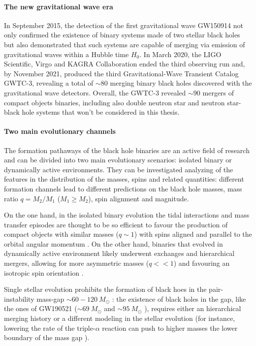 \documentclass[a4paper,titlepage]{book}     	%
\newcommand{\sun}{\ensuremath{_\odot}}
\newcommand{\msun}{\ensuremath{M\sun}}
\begin{document}
\paragraph{The new gravitational wave era} In September 2015, the detection of the first gravitational wave GW150914 not only confirmed the existence of binary systems made of two stellar black holes but also demonstrated that such systems are capable of merging via emission of gravitational waves within a Hubble time $H_0$. \cite{Abbott2016firstGW} In March 2020, the LIGO Scientific, Virgo and KAGRA Collaboration ended the third observing run and, by November 2021, produced the third Gravitational-Wave Transient Catalog GWTC-3, revealing a total of $\sim 80$ merging binary black holes discovered with the gravitational wave detectors. Overall, the GWTC-3 revealed $\sim 90$ mergers of compact objects binaries, including also double neutron star and neutron star-black hole systems that won't be considered in this thesis. \cite{GWTC-3} 


\paragraph{Two main evolutionary channels}
The formation pathaways of the black hole binaries are an active field of research and can be divided into two main evolutionary scenarios: isolated binary or dynamically active environments. They can be investigated analyzing of the features in the distribution of the masses, spins and related quantities: different formation channels lead to different predictions on the black hole masses, mass ratio $q=M_2/M_1$ ($M_1 \geq M_2$), spin alignment and magnitude.
 
On the one hand, in the isolated binary evolution the tidal interactions and mass transfer episodes are thought to be so efficient to favour the production of compact objects with similar masses ($q \sim 1$) \cite{giacobbomapelli2018_mobse_fryer} with spins aligned and parallel to the orbital angular momentum \cite{Kalogera2000_spinaligned}. On the other hand, binaries that evolved in dynamically active environment likely underwent exchanges and hierarchical mergers, allowing for more asymmetric masses ($q << 1$) \cite{Rastello2021_dynamics} and favouring an isotropic spin orientation \cite{Rodriguez2016_BHspins}.

Single stellar evolution prohibits the formation of black hoes in the pair-instability mass-gap $\sim 60 - 120 ~\msun$ \cite{spera2017_pisnSNe}: the existence of black holes in the gap, like the ones of GW190521 ($\sim 69~\msun$ and $\sim 95~\msun$ \cite{GWTC-1}), requires either an hierarchical merging history or a different modeling in the stellar evolution (for instance, lowering the rate of the triple-$\alpha$ reaction can push to higher masses the lower boundary of the mass gap \cite{MassGapStellarEvo_Costa2021}).
\end{document}
